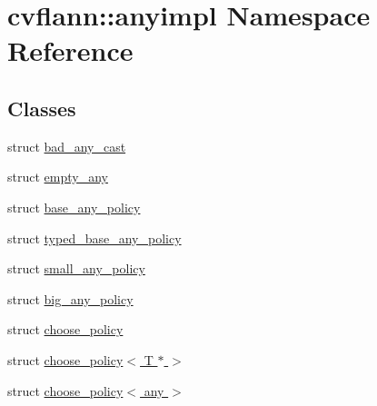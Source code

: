 \hypertarget{namespacecvflann_1_1anyimpl}{\section{cvflann\-:\-:anyimpl Namespace Reference}
\label{namespacecvflann_1_1anyimpl}
}
\subsection*{Classes}
\begin{DoxyCompactItemize}
\item 
struct \hyperlink{structcvflann_1_1anyimpl_1_1bad__any__cast}{bad\-\_\-any\-\_\-cast}
\item 
struct \hyperlink{structcvflann_1_1anyimpl_1_1empty__any}{empty\-\_\-any}
\item 
struct \hyperlink{structcvflann_1_1anyimpl_1_1base__any__policy}{base\-\_\-any\-\_\-policy}
\item 
struct \hyperlink{structcvflann_1_1anyimpl_1_1typed__base__any__policy}{typed\-\_\-base\-\_\-any\-\_\-policy}
\item 
struct \hyperlink{structcvflann_1_1anyimpl_1_1small__any__policy}{small\-\_\-any\-\_\-policy}
\item 
struct \hyperlink{structcvflann_1_1anyimpl_1_1big__any__policy}{big\-\_\-any\-\_\-policy}
\item 
struct \hyperlink{structcvflann_1_1anyimpl_1_1choose__policy}{choose\-\_\-policy}
\item 
struct \hyperlink{structcvflann_1_1anyimpl_1_1choose__policy_3_01T_01_5_01_4}{choose\-\_\-policy$<$ T $\ast$ $>$}
\item 
struct \hyperlink{structcvflann_1_1anyimpl_1_1choose__policy_3_01any_01_4}{choose\-\_\-policy$<$ any $>$}
\end{DoxyCompactItemize}

